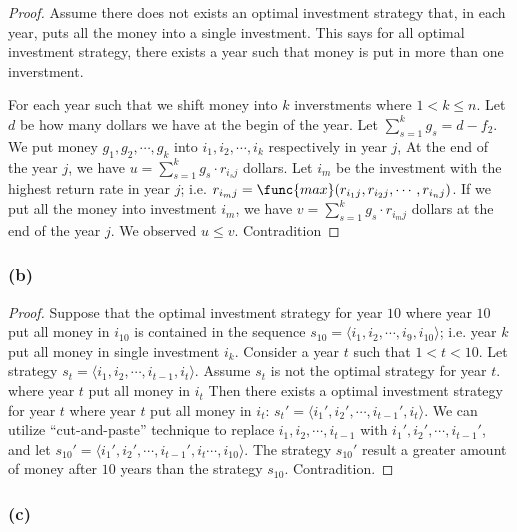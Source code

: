 \begin{proof}
    Assume there does not exists an optimal investment strategy that, 
    in each year, puts all the money into a single investment.
    This says for all optimal investment strategy,
    there exists a year such that 
    money is put in more than one inverstment.

    For each year such that 
    we shift money into $k$ inverstments where $1 < k \leq n$.
    Let $d$ be how many dollars we have at the begin of the year.
    Let $\sum\limits_{s=1}^{k} g_s = d - f_2$.
    We put money $g_1, g_2, \cdots, g_k$ 
    into $i_1, i_2, \cdots, i_k$ respectively in year $j$,
    At the end of the year $j$,
    we have $u = \sum\limits_{s=1}^{k} g_s \cdot r_{i_s j}$ dollars.
    Let $i_m$ be the investment with the highest return rate in year $j$;
    i.e. $r_{i_m j} = \func{max}(r_{i_1 j}, r_{i_2 j}, \cdots, r_{i_n j})$.
    If we put all the money into investment $i_m$,
    we have $v = \sum\limits_{s=1}^{k} g_s \cdot r_{i_m j}$ dollars 
    at the end of the year $j$.
    We observed $u \leq v$. 
    Contradition
\end{proof}

\subsubsection*{(b)}

\begin{proof}
    Suppose that the optimal investment strategy for year $10$ 
    where year $10$ put all money in $i_{10}$
    is contained in the sequence 
    $s_{10} = \langle i_1, i_2, \cdots, i_9, i_{10} \rangle$;
    i.e. year $k$ put all money in single investment $i_k$.
    Consider a year $t$ such that $1 < t < 10$.
    Let strategy 
    $s_t = \langle i_1, i_2, \cdots, i_{t-1}, i_t \rangle$.
    Assume $s_t$ is not the optimal strategy for year $t$.
    where year $t$ put all money in $i_{t}$
    Then there exists a optimal investment strategy for year $t$
    where year $t$ put all money in $i_{t}$:
    $s_t' = \langle i_1', i_2', \cdots, i_{t-1}', i_t \rangle$.
    We can utilize ``cut-and-paste'' technique to replace 
    $i_1, i_2, \cdots, i_{t-1}$ with $i_1', i_2', \cdots, i_{t-1}'$,
    and let $s_{10}' = \langle i_1', i_2', \cdots, i_{t-1}', 
    i_t \cdots, i_{10} \rangle$.
    The strategy $s_{10}'$ result a greater amount of money 
    after $10$ years than the strategy $s_{10}$.
    Contradition.
\end{proof}

\subsubsection*{(c)}

